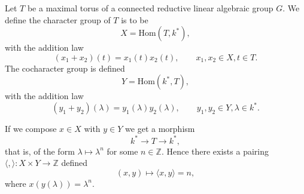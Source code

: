 Let $T$ be a maximal torus of a connected reductive linear algebraic group $G$. We define the character group of $T$ is to be 
\begin{displaymath}
	X = \textrm{Hom}(T, k^*),
\end{displaymath}
with the addition law
\begin{displaymath}
	(x_1 + x_2)(t) = x_1(t)x_2(t),\qquad x_1, x_2\in X, t\in T.
\end{displaymath}
The cocharacter group is defined
\begin{displaymath}
	Y = \textrm{Hom}(k^*, T),
\end{displaymath}
with the addition law
\begin{displaymath}
	(y_1 + y_2)(\lambda) = y_1(\lambda)y_2(\lambda),\qquad y_1, y_2\in Y, \lambda \in k^*.
\end{displaymath}

If we compose $x\in X$ with $y\in Y$ we get a morphism
\begin{displaymath}
	k^*\rightarrow T \rightarrow k^*,
\end{displaymath}
that is, of the form $\lambda\mapsto \lambda^n$ for some $n\in \mathbb{Z}$. Hence there exists a pairing $\langle,\rangle:X\times Y\rightarrow \mathbb{Z}$ defined
\begin{displaymath}
	(x, y) \mapsto \langle x, y\rangle = n,
\end{displaymath}
where $x(y(\lambda)) = \lambda^n$. 
